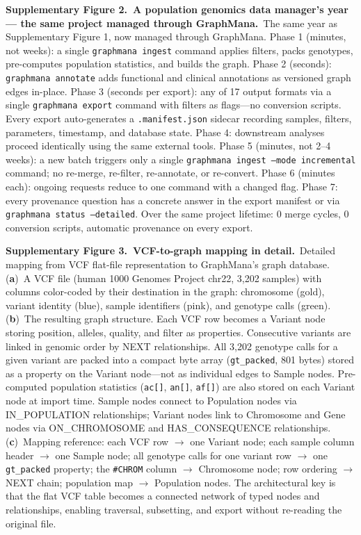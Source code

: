 \documentclass[11pt,a4paper]{article}
\begin{document}
\noindent\textbf{Supplementary Figure 2.~A population genomics data manager's year --- the same project managed through GraphMana.}~The same year as Supplementary Figure 1, now managed through GraphMana. Phase 1 (minutes, not weeks): a single \texttt{graphmana ingest} command applies filters, packs genotypes, pre-computes population statistics, and builds the graph. Phase 2 (seconds): \texttt{graphmana annotate} adds functional and clinical annotations as versioned graph edges in-place. Phase 3 (seconds per export): any of 17 output formats via a single \texttt{graphmana export} command with filters as flags---no conversion scripts. Every export auto-generates a \texttt{.manifest.json} sidecar recording samples, filters, parameters, timestamp, and database state. Phase 4: downstream analyses proceed identically using the same external tools. Phase 5 (minutes, not 2--4 weeks): a new batch triggers only a single \texttt{graphmana ingest --mode incremental} command; no re-merge, re-filter, re-annotate, or re-convert. Phase 6 (minutes each): ongoing requests reduce to one command with a changed flag. Phase 7: every provenance question has a concrete answer in the export manifest or via \texttt{graphmana status --detailed}. Over the same project lifetime: 0 merge cycles, 0 conversion scripts, automatic provenance on every export.

\vspace{0.8em}

\noindent\textbf{Supplementary Figure 3.~VCF-to-graph mapping in detail.}~Detailed mapping from VCF flat-file representation to GraphMana's graph database. (\textbf{a})~A VCF file (human 1000 Genomes Project chr22, 3,202 samples) with columns color-coded by their destination in the graph: chromosome (gold), variant identity (blue), sample identifiers (pink), and genotype calls (green). (\textbf{b})~The resulting graph structure. Each VCF row becomes a Variant node storing position, alleles, quality, and filter as properties. Consecutive variants are linked in genomic order by NEXT relationships. All 3,202 genotype calls for a given variant are packed into a compact byte array (\texttt{gt\_packed}, 801 bytes) stored as a property on the Variant node---not as individual edges to Sample nodes. Pre-computed population statistics (\texttt{ac[]}, \texttt{an[]}, \texttt{af[]}) are also stored on each Variant node at import time. Sample nodes connect to Population nodes via IN\_POPULATION relationships; Variant nodes link to Chromosome and Gene nodes via ON\_CHROMOSOME and HAS\_CONSEQUENCE relationships. (\textbf{c})~Mapping reference: each VCF row $\rightarrow$ one Variant node; each sample column header $\rightarrow$ one Sample node; all genotype calls for one variant row $\rightarrow$ one \texttt{gt\_packed} property; the \texttt{\#CHROM} column $\rightarrow$ Chromosome node; row ordering $\rightarrow$ NEXT chain; population map $\rightarrow$ Population nodes. The architectural key is that the flat VCF table becomes a connected network of typed nodes and relationships, enabling traversal, subsetting, and export without re-reading the original file.
\end{document}
